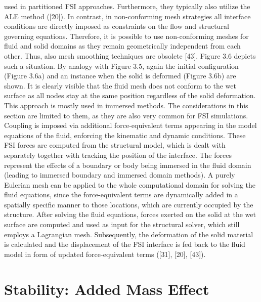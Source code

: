used in partitioned FSI approaches. Furthermore, they typically also utilize the ALE method ([20]).
In contrast, in non-conforming mesh strategies all interface conditions are directly imposed as constraints
on the flow and structural governing equations. Therefore, it is possible to use non-conforming meshes
for fluid and solid domains as they remain geometrically independent from each other. Thus, also mesh
smoothing techniques are obsolete [43]. Figure 3.6 depicts such a situation. By analogy with Figure 3.5,
again the initial configuration (Figure 3.6a) and an instance when the solid is deformed (Figure 3.6b) are
shown. It is clearly visible that the fluid mesh does not conform to the wet surface as all nodes stay at
the same position regardless of the solid deformation.
This approach is mostly used in immersed methods. The considerations in this section are limited to them,
as they are also very common for FSI simulations. Coupling is imposed via additional force-equivalent
terms appearing in the model equations of the fluid, enforcing the kinematic and dynamic conditions.
These FSI forces are computed from the structural model, which is dealt with separately together with
tracking the position of the interface. The forces represent the effects of a boundary or body being
immersed in the fluid domain (leading to immersed boundary and immersed domain methods). A purely
Eulerian mesh can be applied to the whole computational domain for solving the fluid equations, since
the force-equivalent terms are dynamically added in a spatially specific manner to those locations, which
are currently occupied by the structure. After solving the fluid equations, forces exerted on the solid at
the wet surface are computed and used as input for the structural solver, which still employs a Lagrangian
mesh. Subsequently, the deformation of the solid material is calculated and the displacement of the FSI
interface is fed back to the fluid model in form of updated force-equivalent terms ([31], [20], [43]).

\section{Stability: Added Mass Effect}
\label{sec:addedd-mass}

